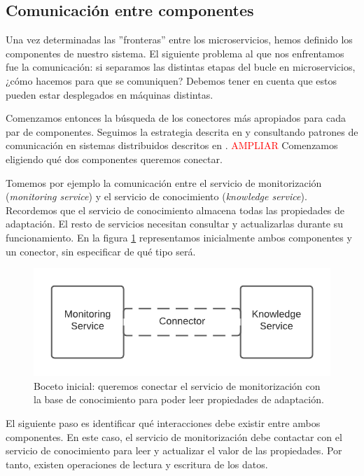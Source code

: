 \subsection{Comunicación entre componentes}

Una vez determinadas las ''fronteras'' entre los microservicios, hemos definido los componentes de nuestro sistema. El siguiente problema al que nos enfrentamos fue la comunicación: si separamos las distintas etapas del bucle en microservicios, ¿cómo hacemos para que se comuniquen? Debemos tener en cuenta que estos pueden estar desplegados en máquinas distintas.

Comenzamos entonces la búsqueda de los conectores más apropiados para cada par de componentes. Seguimos la estrategia descrita en \cite{taylorSoftwareArchitectureFoundations2009} y consultando patrones de comunicación en sistemas distribuidos descritos en \cite{newmanBuildingMicroservicesDesigning2021}. \textcolor{red}{AMPLIAR} Comenzamos eligiendo qué dos componentes queremos conectar.

Tomemos por ejemplo la comunicación entre el servicio de monitorización (\textit{monitoring service}) y el servicio de conocimiento (\textit{knowledge service}). Recordemos que el servicio de conocimiento almacena todas las propiedades de adaptación. El resto de servicios necesitan consultar y actualizarlas durante su funcionamiento. En la figura \ref{fig:monitor-knowledge-initial} representamos inicialmente ambos componentes y un conector, sin especificar de qué tipo será.

\begin{figure}[h]
  \centering
  \includegraphics{02_arquitectura/images/Monitor-Knowledge-Initial-Connector}
  \caption{Boceto inicial: queremos conectar el servicio de monitorización con la base de conocimiento para poder leer propiedades de adaptación.}
  \label{fig:monitor-knowledge-initial}
\end{figure}

El siguiente paso es identificar qué interacciones debe existir entre ambos componentes. En este caso, el servicio de monitorización debe contactar con el servicio de conocimiento para leer y actualizar el valor de las propiedades. Por tanto, existen operaciones de lectura y escritura de los datos.

